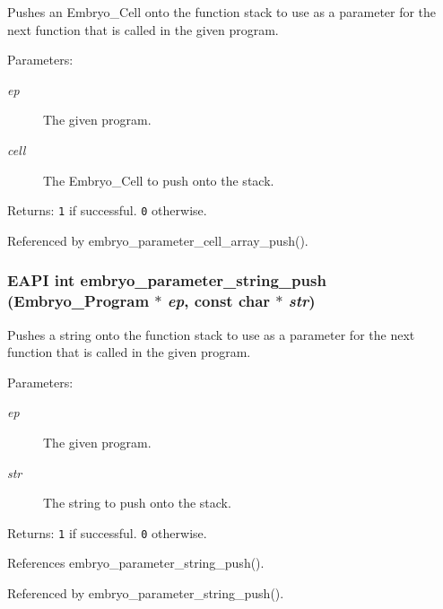 Pushes an Embryo\_\-Cell onto the function stack to use as a parameter for the next function that is called in the given program. 

\begin{Desc}
\item[Parameters:]
\begin{description}
\item[{\em ep}]The given program. \item[{\em cell}]The Embryo\_\-Cell to push onto the stack. \end{description}
\end{Desc}
\begin{Desc}
\item[Returns:]{\tt 1} if successful. {\tt 0} otherwise. \end{Desc}


Referenced by embryo\_\-parameter\_\-cell\_\-array\_\-push().\hypertarget{group__Embryo__Parameter__Group_gf10dc40b19efee3aaa23e9ba71372721}{
\subsubsection{\setlength{\rightskip}{0pt plus 5cm}EAPI int embryo\_\-parameter\_\-string\_\-push (Embryo\_\-Program $\ast$ {\em ep}, \/  const char $\ast$ {\em str})}}
\label{group__Embryo__Parameter__Group_gf10dc40b19efee3aaa23e9ba71372721}


Pushes a string onto the function stack to use as a parameter for the next function that is called in the given program. 

\begin{Desc}
\item[Parameters:]
\begin{description}
\item[{\em ep}]The given program. \item[{\em str}]The string to push onto the stack. \end{description}
\end{Desc}
\begin{Desc}
\item[Returns:]{\tt 1} if successful. {\tt 0} otherwise. \end{Desc}


References embryo\_\-parameter\_\-string\_\-push().

Referenced by embryo\_\-parameter\_\-string\_\-push().